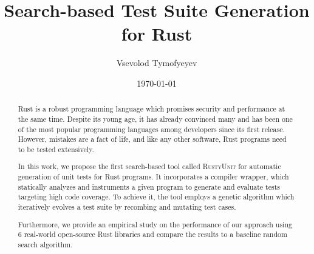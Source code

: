 \documentclass[paper=a4,%
  twoside,%
  BCOR4mm,%
  abstract=true,%
  toc=bibliography,%
  chapterprefix=true,%
  toc=bibliographynumbered,%
  open=right,%
  english,%
  pagesize=pdftex]{scrreprt}
\newcommand{\authorname}{Vsevolod Tymofyeyev}
\newcommand{\thesistitle}{Search-based Test Suite Generation for Rust}
\newcommand{\benchnum}{6\xspace}
\newcommand{\tech}{\textsc{RustyUnit}\xspace}
\begin{document}
\frontmatter
\subject{\normalfont~\\[0.5cm]
  ~\\[1.5cm]
  Master's Thesis in Computer Science}
\title{\normalfont \thesistitle{}}
\author{\authorname{}}
\date{\today}
\publishers{Examiners:\\{Prof. Dr. Gordon Fraser}\\
  {\large (Chair of Software Engineering II)}\\[2ex]
  {Prof. Dr. Christian Hammer}\\
  {\large (Chair of Software Engineering I)}
  }
\lowertitleback{~\\
  \textbf{\authorname{}}:\\
  \emph{\thesistitle{}}\\
  Master's Thesis, University of Passau, 2022.
}
\maketitle

\begin{abstract}
  Rust is a robust programming language which promises security and performance at the same time. Despite its young age, it has already convinced many and has been one of the most popular programming languages among developers since its first release. However, mistakes are a fact of life, and like any other software, Rust programs need to be tested extensively.

  In this work, we propose the first search-based tool called \tech for automatic generation of unit tests for Rust programs. It incorporates a compiler wrapper, which statically analyzes and instruments a given program to generate and evaluate tests targeting high code coverage. To achieve it, the tool employs a genetic algorithm which iteratively evolves a test suite by recombing and mutating test cases.

  Furthermore, we provide an empirical study on the performance of our approach using \benchnum real-world open-source Rust libraries and compare the results to a baseline random search algorithm.
\end{abstract}
\cleardoublepage
\tableofcontents

\mainmatter%
\end{document}
